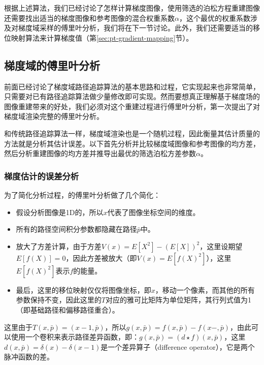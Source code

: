 根据上述算法，我们已经讨论了怎样计算梯度图像，使用筛选的泊松方程重建图像还需要找出适当的梯度图像和参考图像的混合权重系数$\alpha$，这个最优的权重系数涉及对梯度域采样的傅里叶分析，我们将在下一节讨论。此外，我们还需要适当的移位映射算法来计算梯度值（第\ref{sec:pt-gradient-mapping}节）。






\subsection{梯度域的傅里叶分析}\label{sec:pt-gradient-analysis}
前面已经讨论了梯度域路径追踪算法的基本思路和过程，它实现起来也非常简单，只需要对已有路径追踪算法做少量修改即可实现。然而要想真正理解基于梯度场的图像重建带来的好处，我们必须对这个重建过程进行傅里叶分析，\cite{a:GradientDomainPathTracing}第一次提出了对梯度域渲染完整的傅里叶分析。

和传统路径追踪算法一样，梯度域渲染也是一个随机过程，因此衡量其估计质量的方法就是分析其估计误差。以下首先分析并比较梯度域图像和参考图像的均方差，然后分析重建图像的均方差并推导出最优的筛选泊松方差参数$\alpha$。





\subsubsection{梯度估计的误差分析}
为了简化分析过程，\cite{a:GradientDomainPathTracing}的傅里叶分析做了几个简化：

\begin{itemize}
	\item 假设分析图像是1D的，所以$x$代表了图像坐标空间的维度。
	\item 所有的路径空间积分参数都隐藏在路径$\bar{p}$中。
	\item 放大了方差计算，由于方差$V(x)=E[X^2]-(E[X])^2$，这里设期望$E[f(X)]=0$，因此方差被放大（即$V(x)=E[f(X)^2]$），这里$E[f(X)^2]$表示$f$的能量。
	\item 最后，这里的移位映射仅仅将图像坐标，即$x$，移动一个像素，而其他的所有参数保持不变，因此这里的$T$对应的雅可比矩阵为单位矩阵，其行列式值为1（即基础路径和偏移路径重合）。
\end{itemize}

这里由于$T(x,\bar{p})=(x-1,\bar{p})$，所以$g(x,\bar{p})=f(x,\bar{p})-f(x-,\bar{p})$，由此可以使用一个卷积来表示路径差异函数，即：$g(x,\bar{p})=(d\star f)(x,\bar{p})$，这里$d(x,\bar{p})=\delta(x)-\delta(x-1)$是一个差异算子（difference operator），它是两个脉冲函数的差。

